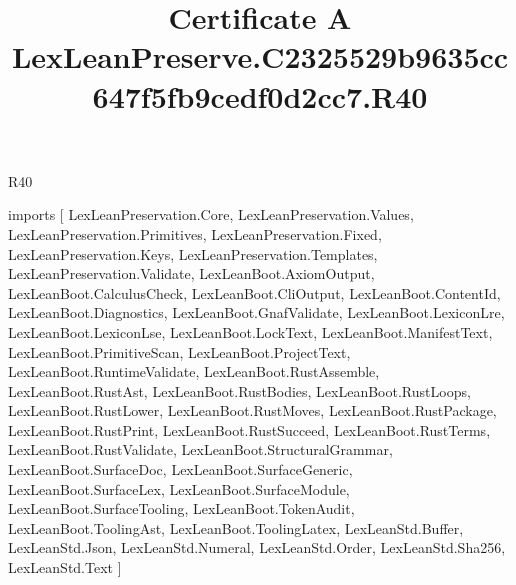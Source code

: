 \begin{lexlean}{R40}
\title{Certificate A LexLeanPreserve.C2325529b9635cc647f5fb9cedf0d2cc7.R40}
\begin{coremodule}
imports [
  LexLeanPreservation.Core,
  LexLeanPreservation.Values,
  LexLeanPreservation.Primitives,
  LexLeanPreservation.Fixed,
  LexLeanPreservation.Keys,
  LexLeanPreservation.Templates,
  LexLeanPreservation.Validate,
  LexLeanBoot.AxiomOutput,
  LexLeanBoot.CalculusCheck,
  LexLeanBoot.CliOutput,
  LexLeanBoot.ContentId,
  LexLeanBoot.Diagnostics,
  LexLeanBoot.GnafValidate,
  LexLeanBoot.LexiconLre,
  LexLeanBoot.LexiconLse,
  LexLeanBoot.LockText,
  LexLeanBoot.ManifestText,
  LexLeanBoot.PrimitiveScan,
  LexLeanBoot.ProjectText,
  LexLeanBoot.RuntimeValidate,
  LexLeanBoot.RustAssemble,
  LexLeanBoot.RustAst,
  LexLeanBoot.RustBodies,
  LexLeanBoot.RustLoops,
  LexLeanBoot.RustLower,
  LexLeanBoot.RustMoves,
  LexLeanBoot.RustPackage,
  LexLeanBoot.RustPrint,
  LexLeanBoot.RustSucceed,
  LexLeanBoot.RustTerms,
  LexLeanBoot.RustValidate,
  LexLeanBoot.StructuralGrammar,
  LexLeanBoot.SurfaceDoc,
  LexLeanBoot.SurfaceGeneric,
  LexLeanBoot.SurfaceLex,
  LexLeanBoot.SurfaceModule,
  LexLeanBoot.SurfaceTooling,
  LexLeanBoot.TokenAudit,
  LexLeanBoot.ToolingAst,
  LexLeanBoot.ToolingLatex,
  LexLeanStd.Buffer,
  LexLeanStd.Json,
  LexLeanStd.Numeral,
  LexLeanStd.Order,
  LexLeanStd.Sha256,
  LexLeanStd.Text
]


\end{coremodule}
\end{lexlean}
